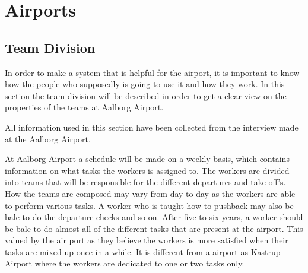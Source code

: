 \chapter{Airports}
\section{Team Division}
In order to make a system that is helpful for the airport, it is important to know how the people who supposedly is going to use it and how they work. In this section the team division will be described in order to get a clear view on the properties of the teams at Aalborg Airport.

All information used in this section have been collected from the interview made at the Aalborg Airport.



At Aalborg Airport a schedule will be made on a weekly basis, which contains information on what tasks the workers is assigned to. The workers are divided into teams that will be responsible for the different departures and take off's. How the teams are composed may vary from day to day as the workers are able to perform various tasks. A worker who is taught how to pushback may also be bale to do the departure checks and so on. After five to six years, a worker should be bale to do almost all of the different tasks that are present at the airport. This valued by the air port as they believe the workers is more satisfied when their tasks are mixed up once in a while. It is different from a airport as Kastrup Airport where the workers are dedicated to one or two tasks only.  